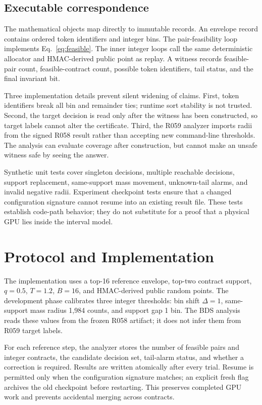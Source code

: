 \documentclass[sigconf,review,nonacm]{acmart}
\begin{document}
\subsection{Executable correspondence}
The mathematical objects map directly to immutable records. An envelope record contains ordered token identifiers and integer bins. The pair-feasibility loop implements Eq.~\eqref{eq:feasible}. The inner integer loops call the same deterministic allocator and HMAC-derived public point as replay. A witness records feasible-pair count, feasible-contract count, possible token identifiers, tail status, and the final invariant bit.

Three implementation details prevent silent widening of claims. First, token identifiers break all bin and remainder ties; runtime sort stability is not trusted. Second, the target decision is read only after the witness has been constructed, so target labels cannot alter the certificate. Third, the R059 analyzer imports radii from the signed R058 result rather than accepting new command-line thresholds. The analysis can evaluate coverage after construction, but cannot make an unsafe witness safe by seeing the answer.

Synthetic unit tests cover singleton decisions, multiple reachable decisions, support replacement, same-support mass movement, unknown-tail alarms, and invalid negative radii. Experiment checkpoint tests ensure that a changed configuration signature cannot resume into an existing result file. These tests establish code-path behavior; they do not substitute for a proof that a physical GPU lies inside the interval model.

\section{Protocol and Implementation}
The implementation uses a top-16 reference envelope, top-two contract support, $q=0.5$, $T=1.2$, $B=16$, and HMAC-derived public random points. The development phase calibrates three integer thresholds: bin shift $\Delta=1$, same-support mass radius 1,984 counts, and support gap 1 bin. The BDS analysis reads these values from the frozen R058 artifact; it does not infer them from R059 target labels.

For each reference step, the analyzer stores the number of feasible pairs and integer contracts, the candidate decision set, tail-alarm status, and whether a correction is required. Results are written atomically after every trial. Resume is permitted only when the configuration signature matches; an explicit fresh flag archives the old checkpoint before restarting. This preserves completed GPU work and prevents accidental merging across contracts.
\end{document}
